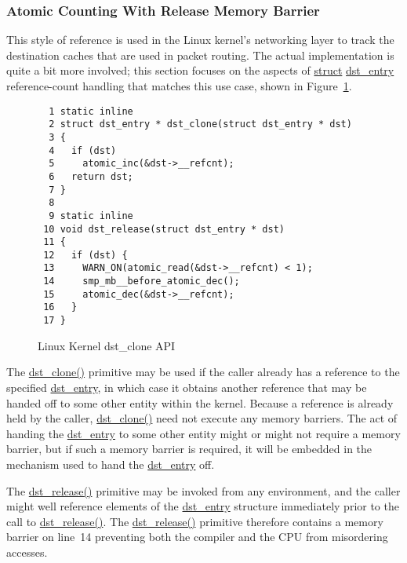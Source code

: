  \QuickQuizEnd

\subsubsection{Atomic Counting With Release Memory Barrier}
\label{sec:defer:Atomic Counting With Release Memory Barrier}

This style of reference is used in the Linux kernel's networking
layer to track the destination caches that are used in packet routing.
The actual implementation is quite a bit more involved; this section
focuses on the aspects of \url{struct} \url{dst_entry} reference-count
handling that matches this use case,
shown in Figure~\ref{fig:defer:Linux Kernel dst-clone API}.

\begin{figure}[htbp]
{ \scriptsize
\begin{verbatim}
  1 static inline
  2 struct dst_entry * dst_clone(struct dst_entry * dst)
  3 {
  4   if (dst)
  5     atomic_inc(&dst->__refcnt);
  6   return dst;
  7 }
  8 
  9 static inline
 10 void dst_release(struct dst_entry * dst)
 11 {
 12   if (dst) {
 13     WARN_ON(atomic_read(&dst->__refcnt) < 1);
 14     smp_mb__before_atomic_dec();
 15     atomic_dec(&dst->__refcnt);
 16   }
 17 }
\end{verbatim}
}
\caption{Linux Kernel dst\_clone API}
\label{fig:defer:Linux Kernel dst-clone API}
\end{figure}

The \url{dst_clone()} primitive may be used if the caller
already has a reference to the specified \url{dst_entry},
in which case it obtains another reference that may be handed off
to some other entity within the kernel.
Because a reference is already held by the caller, \url{dst_clone()}
need not execute any memory barriers.
The act of handing the \url{dst_entry} to some other entity might
or might not require a memory barrier, but if such a memory barrier
is required, it will be embedded in the mechanism used to hand the
\url{dst_entry} off.

The \url{dst_release()} primitive may be invoked from any environment,
and the caller might well reference elements of the \url{dst_entry}
structure immediately prior to the call to \url{dst_release()}.
The \url{dst_release()} primitive therefore contains a memory
barrier on line~14 preventing both the compiler and the CPU
from misordering accesses.

